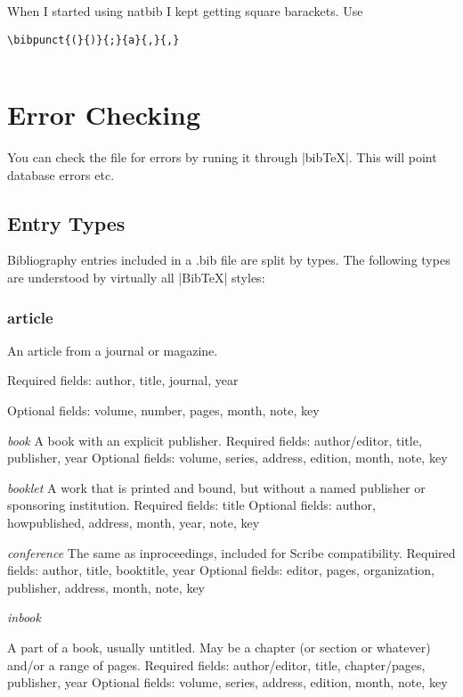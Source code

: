When I started using natbib I kept getting square barackets. Use
\begin{lstlisting}[language={[common]TeX},% 
                           alsolanguage={[LaTeX]TeX},% 
                           alsolanguage={[primitive]TeX},%
                           ]
    \bibpunct{(}{)}{;}{a}{,}{,}
    
\end{lstlisting}

\section{Error Checking}

You can check the file for errors by runing it through |bibTeX|. This will point database errors etc. 


\subsection{Entry Types}

Bibliography entries included in a .bib file are split by types. The following types are understood by virtually all |BibTeX| styles:

\subsubsection*{article}
  An article from a journal or magazine.

  Required fields: author, title, journal, year

  Optional fields: volume, number, pages, month, note, key

\emph{book}
   A book with an explicit publisher.
   Required fields: author/editor, title, publisher, year
   Optional fields: volume, series, address, edition, month, note, key

\emph{booklet}
   A work that is printed and bound, but without a named publisher or sponsoring institution.
   Required fields: title
   Optional fields: author, howpublished, address, month, year, note, key

\emph{conference}
   The same as inproceedings, included for Scribe compatibility.
   Required fields: author, title, booktitle, year
   Optional fields: editor, pages, organization, publisher, address, month, note, key

\emph{inbook}

    A part of a book, usually untitled. May be a chapter (or section or whatever) and/or a range of pages.
    Required fields: author/editor, title, chapter/pages, publisher, year
    Optional fields: volume, series, address, edition, month, note, key

